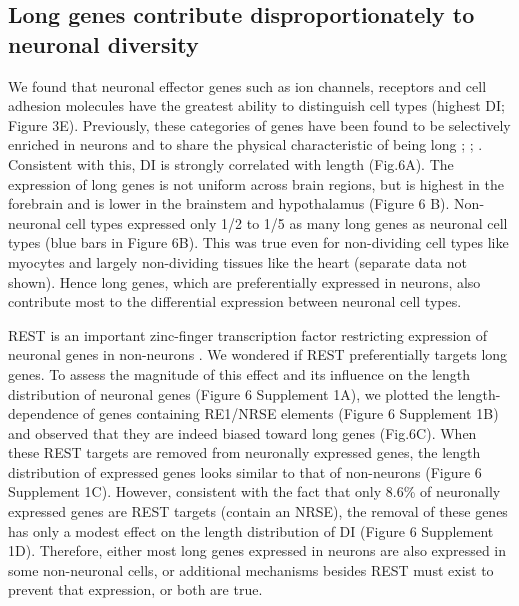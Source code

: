 \subsection{Long genes contribute disproportionately to neuronal diversity}

We found that neuronal effector genes such as ion channels, receptors and cell adhesion molecules have the greatest ability to distinguish cell types (highest DI; Figure 3E). Previously, these categories of genes have been found to be selectively enriched in neurons and to share the physical characteristic of being long \cite{Sugino_2014}; \cite{Gabel_2015}; \cite{Zylka_2015}. Consistent with this, DI is strongly correlated with length (Fig.6A). The expression of long genes is not uniform across brain regions, but is highest in the forebrain and is lower in the brainstem and hypothalamus (Figure 6 B). Non-neuronal cell types expressed only 1/2 to 1/5 as many long genes as neuronal cell types (blue bars in Figure 6B). This was true even for non-dividing cell types like myocytes and largely non-dividing tissues like the heart (separate data not shown). Hence long genes, which are preferentially expressed in neurons, also contribute most to the differential expression between neuronal cell types. 

REST is an important zinc-finger transcription factor restricting expression of neuronal genes in non-neurons \cite{RN1}\cite{RN2a}. We wondered if REST preferentially targets long genes. To assess the magnitude of this effect and its influence on the length distribution of neuronal genes (Figure 6 Supplement 1A), we plotted the length-dependence of genes containing RE1/NRSE elements (Figure 6 Supplement 1B) and observed that they are indeed biased toward long genes (Fig.6C). When these REST targets are removed from neuronally expressed genes, the length distribution of expressed genes looks similar to that of non-neurons (Figure 6 Supplement 1C). However, consistent with the fact that only 8.6\% of neuronally expressed genes are REST targets (contain an NRSE), the removal of these genes has only a modest effect on the length distribution of DI (Figure 6 Supplement 1D). Therefore, either most long genes expressed in neurons are also expressed in some non-neuronal cells, or additional mechanisms besides REST must exist to prevent that expression, or both are true. 

